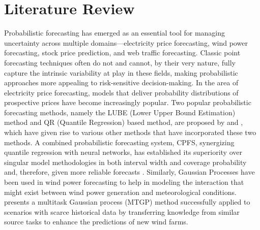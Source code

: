 \chapter{Literature Review}
Probabilistic forecasting has emerged as an essential tool for managing uncertainty across multiple domains—electricity price forecasting, wind power forecasting, stock price prediction, and web traffic forecasting. Classic point forecasting techniques often do not and cannot, by their very nature, fully capture the intrinsic variability at play in these fields, making probabilistic approaches more appealing to risk-sensitive decision-making. In the area of electricity price forecasting, models that deliver probability distributions of prospective prices have become increasingly popular. Two popular probabilistic forecasting methods, namely the LUBE (Lower Upper Bound Estimation) method and QR (Quantile Regression) based method, are proposed by \cite{12} and \cite{13}, which have given rise to various other methods that have incorporated these two methods. A combined probabilistic forecasting system, CPFS, synergizing quantile regression with neural networks, has established its superiority over singular model methodologies in both interval width and coverage probability and, therefore, given more reliable forecasts \cite{9}. Similarly, Gaussian Processes have been used in wind power forecasting to help in modeling the interaction that might exist between wind power generation and meteorological conditions. \cite{10} presents a multitask Gaussian process (MTGP) method successfully applied to scenarios with scarce historical data by transferring knowledge from similar source tasks to enhance the predictions of new wind farms.

